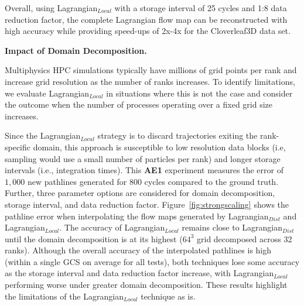 



Overall, using Lagrangian$_{Local}$ with a storage interval of 25 cycles and 1:8 data reduction factor, the complete Lagrangian flow map can be reconstructed with high accuracy while providing speed-ups of 2x-4x for the Cloverleaf3D data set.

\textbf{Impact of Domain Decomposition.}
%

%
Multiphysics HPC simulations typically have millions of grid points per rank and increase grid resolution as the number of ranks increases. 
%
To identify limitations, we evaluate Lagrangian$_{Local}$ in situations where this is not the case and consider the outcome when the number of processes operating over a fixed grid size increases.
%
%

Since the Lagrangian$_{Local}$ strategy is to discard trajectories exiting the rank-specific domain, this approach is susceptible to low resolution data blocks (i.e, sampling would use a small number of particles per rank) and longer storage intervals (i.e., integration times).
%
This \textbf{AE1} experiment measures the error of $1,000$ new pathlines generated for 800 cycles compared to the ground truth. 
%
Further, three parameter options are considered for domain decomposition, storage interval, and data reduction factor. 
%
Figure~\ref{fig:strongscaling} shows the pathline error when interpolating the flow maps generated by Lagrangian$_{Dist}$ and Lagrangian$_{Local}$. 
%
The accuracy of Lagrangian$_{Local}$ remains close to Lagrangian$_{Dist}$ until the domain decomposition is at its highest ($64^{3}$ grid decomposed across 32 ranks).
%
%
Although the overall accuracy of the interpolated pathlines is high (within a single GCS on average for all tests), both techniques lose some accuracy as the storage interval and data reduction factor increase, with Lagrangian$_{Local}$ performing worse under greater domain decomposition.
%
These results highlight the limitations of the Lagrangian$_{Local}$ technique as is.
%

